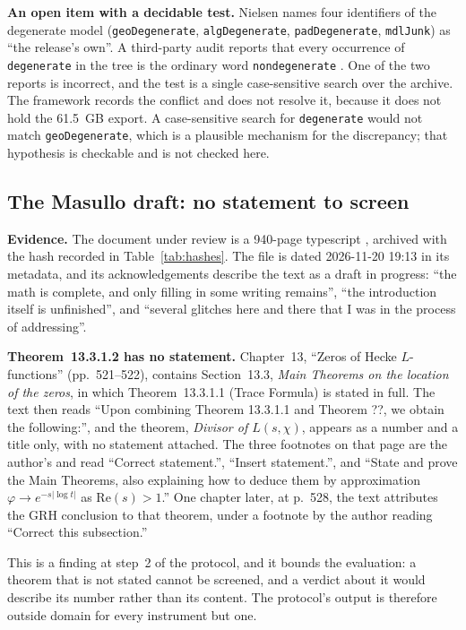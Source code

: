 \documentclass[11pt,a4paper]{article}
\newcommand{\verdict}[1]{\textsf{#1}}
\begin{document}
\textbf{An open item with a decidable test.} Nielsen names four identifiers of the
degenerate model (\texttt{geoDegenerate}, \texttt{algDegenerate}, \texttt{padDegenerate},
\texttt{mdlJunk}) as ``the release's own''. A third-party audit reports that every occurrence of
\texttt{degenerate} in the tree is the ordinary word \texttt{nondegenerate} \cite{chu}. One of the
two reports is incorrect, and the test is a single case-sensitive search over the archive. The
framework records the conflict and does not resolve it, because it does not hold the 61.5~GB
export. A case-sensitive search for \texttt{degenerate} would not match \texttt{geoDegenerate},
which is a plausible mechanism for the discrepancy; that hypothesis is checkable and is not checked
here.

\subsection{The Masullo draft: no statement to screen}
\label{sec:masullo}

\textbf{Evidence.} The document under review is a 940-page typescript \cite{masullo},
archived with the hash recorded in Table~\ref{tab:hashes}. The file is dated 2026-11-20 19:13 in
its metadata, and its acknowledgements describe the text as a draft in progress: ``the math is
complete, and only filling in some writing remains'', ``the introduction itself is unfinished'', and
``several glitches here and there that I was in the process of addressing''.

\textbf{Theorem~13.3.1.2 has no statement.} Chapter~13, ``Zeros of Hecke
$L$-functions'' (pp.~521--522), contains Section~13.3, \emph{Main Theorems on the location of the
zeros}, in which Theorem~13.3.1.1 (Trace Formula) is stated in full. The text then reads ``Upon
combining Theorem 13.3.1.1 and Theorem ??, we obtain the following:'', and the theorem,
\emph{Divisor of $L(s,\chi)$}, appears as a number and a title only, with no statement attached.
The three footnotes on that page are the author's and read ``Correct statement.'', ``Insert
statement.'', and ``State and prove the Main Theorems, also explaining how to deduce them by
approximation $\varphi\to e^{-s|\log t|}$ as $\mathrm{Re}(s)>1$.'' One chapter later, at p.~528,
the text attributes the GRH conclusion to that theorem, under a footnote by the author reading
``Correct this subsection.''

This is a finding at step~2 of the protocol, and it bounds the evaluation: a theorem that
is not stated cannot be screened, and a verdict about it would describe its number rather than its
content. The protocol's output is therefore \verdict{outside domain} for every instrument but
one.
\end{document}
